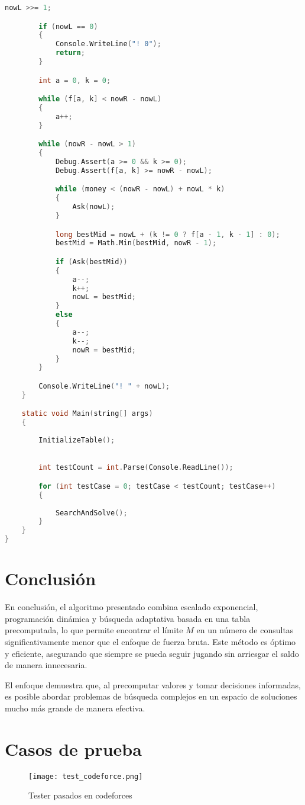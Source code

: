 \documentclass{article}
\begin{document}
\begin{lstlisting}[language=C]
        nowL >>= 1; 

        if (nowL == 0)
        {
            Console.WriteLine("! 0");
            return;
        }

        int a = 0, k = 0;

        while (f[a, k] < nowR - nowL)
        {
            a++;
        }

        while (nowR - nowL > 1)
        {
            Debug.Assert(a >= 0 && k >= 0);
            Debug.Assert(f[a, k] >= nowR - nowL);

            while (money < (nowR - nowL) + nowL * k)
            {
                Ask(nowL);
            }

            long bestMid = nowL + (k != 0 ? f[a - 1, k - 1] : 0);
            bestMid = Math.Min(bestMid, nowR - 1);

            if (Ask(bestMid))
            {
                a--;
                k++;
                nowL = bestMid;
            }
            else
            {
                a--;
                k--;
                nowR = bestMid;
            }
        }

        Console.WriteLine("! " + nowL);
    }

    static void Main(string[] args)
    {
        
        InitializeTable();

        
        int testCount = int.Parse(Console.ReadLine());

        for (int testCase = 0; testCase < testCount; testCase++)
        {
            
            SearchAndSolve();
        }
    }
}
\end{lstlisting}
\section{Conclusión}
En conclusión, el algoritmo presentado combina escalado exponencial, programación dinámica y búsqueda adaptativa basada en una tabla precomputada, lo que permite encontrar el límite \(M\) en un número de consultas significativamente menor que el enfoque de fuerza bruta. Este método es óptimo y eficiente, asegurando que siempre se pueda seguir jugando sin arriesgar el saldo de manera innecesaria.

El enfoque demuestra que, al precomputar valores y tomar decisiones informadas, es posible abordar problemas de búsqueda complejos en un espacio de soluciones mucho más grande de manera efectiva.
\section{Casos de prueba}

\begin{figure}[H] 
    \centering 
    \texttt{[image: test\_codeforce.png]} 
    \caption{Tester pasados en codeforces}
\end{figure}
\end{document}

